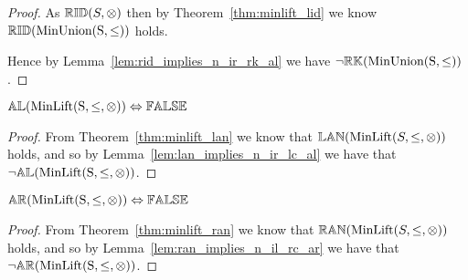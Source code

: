 \begin{proof}

\vspace{0.5em}
As ${\mathbb{RID}}(S, \otimes)$ then by Theorem~\ref{thm:minlift_lid} we know ${\mathbb{RID}}(\mathrm{MinUnion(S,\leq)})$ holds.

\vspace{0.5em}
Hence by Lemma~\ref{lem:rid_implies_n_ir_rk_al} we have $\neg {\mathbb{RK}}(\mathrm{MinUnion(S,\leq)})$.
\end{proof}





\begin{theorem} \label{thm:minlift_al}
${\mathbb{AL}}(\mathrm{MinLift(S,\leq,\otimes)}) \Leftrightarrow {\mathbb{FALSE}}$
\end{theorem}

\begin{proof}

\vspace{0.5em}
From Theorem~\ref{thm:minlift_lan} we know that ${\mathbb{LAN}}(\mathrm{MinLift}(S,\leq,\otimes))$ holds, and so by Lemma~\ref{lem:lan_implies_n_ir_lc_al} we have that $\neg {\mathbb{AL}}(\mathrm{MinLift(S,\leq,\otimes)})$.
\end{proof}



\begin{theorem} \label{thm:minlift_ar}
${\mathbb{AR}}(\mathrm{MinLift(S,\leq,\otimes)}) \Leftrightarrow {\mathbb{FALSE}}$
\end{theorem}

\begin{proof}

\vspace{0.5em}
From Theorem~\ref{thm:minlift_ran} we know that ${\mathbb{RAN}}(\mathrm{MinLift}(S,\leq,\otimes))$ holds, and so by Lemma~\ref{lem:ran_implies_n_il_rc_ar} we have that $\neg {\mathbb{AR}}(\mathrm{MinLift(S,\leq,\otimes)})$.
\end{proof}

